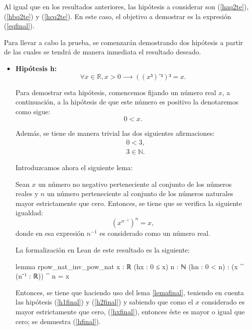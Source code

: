 \begin{demostracion}
  Al igual que en los resultados anteriores, las hipótesis a considerar son
  (\ref{haq2te}), (\ref{hbq2te}) y (\ref{hcq2te}). En este caso, el
  objetivo a demostrar es la expresión (\ref{eqfinal}).

  Para llevar a cabo la prueba, se comenzarán demostrando dos hipótesis
  a partir de las cuales se tendrá de manera inmediata el resultado
  deseado.
  \begin{itemize}
  \item \textbf{Hipótesis h:}
    \begin{equation}\label{hfinal}\tag{h}
      ∀x∈ ℝ, x>0 ⟶((x³)⁻¹)³ =x.
    \end{equation}

    Para demostrar esta hipótesis, comencemos fijando un número real \(x\),
    a continuación, a la hipótesis de que este número es positivo la
    denotaremos como sigue:
    \begin{equation}\label{hxfinal}\tag{hx}
      0<x.
    \end{equation}

    Además, se tiene de manera trivial las dos siguientes afirmaciones:
    \begin{align}
      &0<3,\label{h1final}\tag{h1}\\
      &3∈ℕ. \label{h2final}\tag{h2}
    \end{align}

    Introduzcamos ahora el siguiente lema:
    \begin{lema}\label{lemafinal}
      Sean \(x\) un número no negativo perteneciente al conjunto de los
      números reales y \(n\) un número perteneciente al conjunto de los
      números naturales mayor estrictamente que cero. Entonces, se tiene
      que se verifica la siguiente igualdad:
      \begin{equation}
        (x^{n^{-1}})^n=x,
      \end{equation}
      donde en esa expresión \(n^{-1} \) es considerado como un número
      real.
    \end{lema}
    La formalización en Lean de este resultado es la siguiente:
    \begin{leancode}
      lemma rpow_nat_inv_pow_nat {x : ℝ} (hx : 0 ≤ x) {n : ℕ} (hn : 0 < n) :
      (x ^ (n⁻¹ : ℝ)) ^ n = x
    \end{leancode}

    Entonces, se tiene que haciendo uso del lema \ref{lemafinal}, teniendo
    en cuenta las hipótesis (\ref{h1final}) y (\ref{h2final}) y sabiendo
    que como el \(x\) considerado es mayor estrictamente que cero,
    (\ref{hxfinal}), entonces éste es mayor o igual que cero; se demuestra
    (\ref{hfinal}).    
    

\end{itemize}
\end{demostracion}
